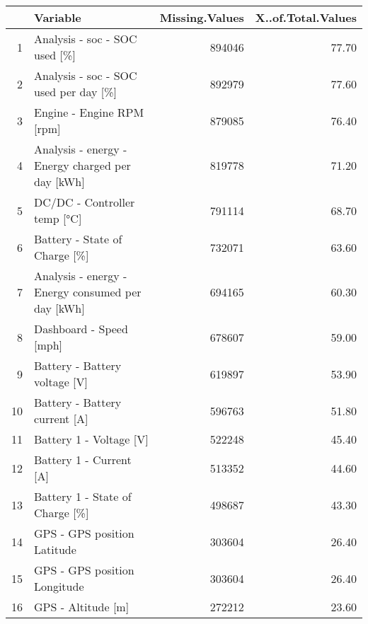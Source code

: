 \begin{table}[ht]
\centering
\begin{tabular}{rlrr}
  \hline
 & Variable & Missing.Values & X..of.Total.Values \\ 
  \hline
1 & Analysis - soc - SOC used [\%] & 894046 & 77.70 \\ 
  2 & Analysis - soc - SOC used per day [\%] & 892979 & 77.60 \\ 
  3 & Engine - Engine RPM [rpm] & 879085 & 76.40 \\ 
  4 & Analysis - energy - Energy charged per day [kWh] & 819778 & 71.20 \\ 
  5 & DC/DC - Controller temp [°C] & 791114 & 68.70 \\ 
  6 & Battery - State of Charge [\%] & 732071 & 63.60 \\ 
  7 & Analysis - energy - Energy consumed per day [kWh] & 694165 & 60.30 \\ 
  8 & Dashboard - Speed [mph] & 678607 & 59.00 \\ 
  9 & Battery - Battery voltage [V] & 619897 & 53.90 \\ 
  10 & Battery - Battery current [A] & 596763 & 51.80 \\ 
  11 & Battery 1 - Voltage [V] & 522248 & 45.40 \\ 
  12 & Battery 1 - Current [A] & 513352 & 44.60 \\ 
  13 & Battery 1 - State of Charge [\%] & 498687 & 43.30 \\ 
  14 & GPS - GPS position Latitude & 303604 & 26.40 \\ 
  15 & GPS - GPS position Longitude & 303604 & 26.40 \\ 
  16 & GPS - Altitude [m] & 272212 & 23.60 \\ 
   \hline
\end{tabular}
\end{table}

